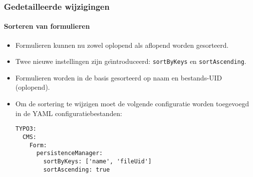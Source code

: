 \begin{frame}[fragile]
	\frametitle{Gedetailleerde wijzigingen}
	\framesubtitle{Sorteren van formulieren}

	\lstset{basicstyle=\tiny\ttfamily}

	\begin{itemize}
		\item Formulieren kunnen nu zowel oplopend als aflopend worden gesorteerd.
		\item Twee nieuwe instellingen zijn ge\"{\i}ntroduceerd: \texttt{sortByKeys} en \texttt{sortAscending}.
		\item Formulieren worden in de basis gesorteerd op naam en bestands-UID (oplopend).
		\item Om de sortering te wijzigen moet de volgende configuratie worden toegevoegd in de YAML configuratiebestanden:
\begin{lstlisting}
TYPO3:
  CMS:
    Form:
      persistenceManager:
        sortByKeys: ['name', 'fileUid']
        sortAscending: true
\end{lstlisting}

	\end{itemize}

\end{frame}

